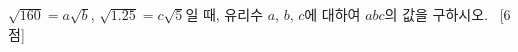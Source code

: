 $\sqrt{160}=a\sqrt{b}$, $\sqrt{1.25}=c\sqrt{5}$일 때, 유리수 $a$, $b$, $c$에 대하여 $abc$의 값을 구하시오. ~\mbox{\mbox{[6점]}}
